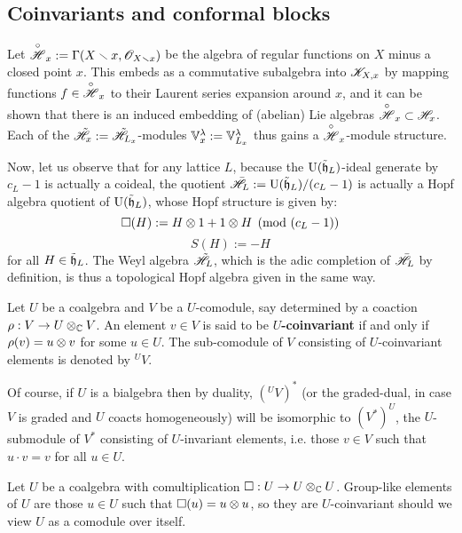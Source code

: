     \subsection{Coinvariants and conformal blocks}
        Let $\overset{\circ}{\mathscr{H}}_x := \Gamma(X \smallsetminus x, \mathscr{O}_{X \smallsetminus x})$ be the algebra of regular functions on $X$ minus a closed point $x$. This embeds as a commutative subalgebra into $\mathscr{K}_{X, x}$ by mapping functions $f \in \overset{\circ}{\mathscr{H}}_x$ to their Laurent series expansion around $x$, and it can be shown that there is an induced embedding of (abelian) Lie algebras $\overset{\circ}{\mathscr{H}}_x \subset \mathscr{H}_x$. Each of the $\tilde{\mathscr{H}}_x := \tilde{\mathscr{H}}_{L_x}$-modules $\mathbb{V}_x^{\lambda} := \mathbb{V}_{L_x}^{\lambda}$ thus gains a $\overset{\circ}{\mathscr{H}}_x$-module structure.

        Now, let us observe that for any lattice $L$, because the $\mathrm{U}(\tilde{\mathfrak{h}}_L)$-ideal generate by $c_L - 1$ is actually a coideal, the quotient $\bar{\mathscr{H}}_L := \mathrm{U}(\tilde{\mathfrak{h}}_L)/(c_L - 1)$ is actually a Hopf algebra quotient of $\mathrm{U}(\tilde{\mathfrak{h}}_L)$, whose Hopf structure is given by:
            $$\Box(H) := H \tensor 1 + 1 \tensor H \pmod{(c_L - 1)}$$
            $$S(H) := -H$$
        for all $H \in \tilde{\mathfrak{h}}_L$. The Weyl algebra $\tilde{\mathscr{H}}_L$, which is the adic completion of $\bar{\mathscr{H}}_L$ by definition, is thus a topological Hopf algebra given in the same way.

        \begin{definition}[Coinvariants] \label{def: coinvariants}
            Let $U$ be a coalgebra and $V$ be a $U$-comodule, say determined by a coaction $\rho: V \to U \tensor_{\bbC} V$. An element $v \in V$ is said to be \textbf{$U$-coinvariant} if and only if $\rho(v) = u \tensor v$ for some $u \in U$. The sub-comodule of $V$ consisting of $U$-coinvariant elements is denoted by ${}^UV$.
        \end{definition}
        Of course, if $U$ is a bialgebra then by duality, $({}^UV)^*$ (or the graded-dual, in case $V$ is graded and $U$ coacts homogeneously) will be isomorphic to $(V^*)^U$, the $U$-submodule of $V^*$ consisting of $U$-invariant elements, i.e. those $v \in V$ such that $u \cdot v = v$ for all $u \in U$. 
        \begin{example}
            Let $U$ be a coalgebra with comultiplication $\Box: U \to U \tensor_{\bbC} U$. Group-like elements of $U$ are those $u \in U$ such that $\Box(u) = u \tensor u$, so they are $U$-coinvariant should we view $U$ as a comodule over itself.
        \end{example}

